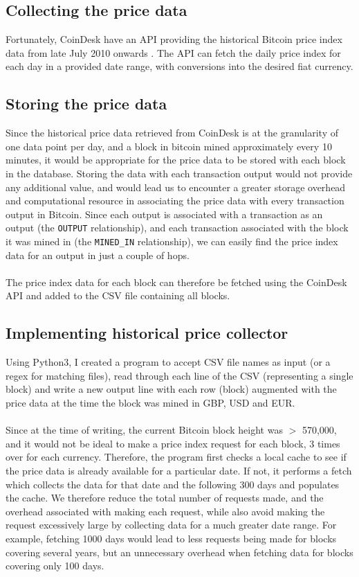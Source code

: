 \subsection{Collecting the price data}
Fortunately, CoinDesk have an API providing the historical Bitcoin price index data from late July 2010 onwards \cite{RefWorks:doc:5cacd8cbe4b092e311880f2b}. The API can fetch the daily price index for each day in a provided date range, with conversions into the desired fiat currency. 

\subsection{Storing the price data}
Since the historical price data retrieved from CoinDesk is at the granularity of one data point per day, and a block in bitcoin mined approximately every 10 minutes, it would be appropriate for the price data to be stored with each block in the database. Storing the data with each transaction output would not provide any additional value, and would lead us to encounter a greater storage overhead and computational resource in associating the price data with every transaction output in Bitcoin. Since each output is associated with a transaction as an output (the \texttt{OUTPUT} relationship), and each transaction associated with the block it was mined in (the \texttt{MINED\_IN} relationship), we can easily find the price index data for an output in just a couple of hops. 
\\\\
The price index data for each block can therefore be fetched using the CoinDesk API and added to the CSV file containing all blocks. 

\subsection{Implementing historical price collector}
Using Python3, I created a program to accept CSV file names as input (or a regex for matching files), read through each line of the CSV (representing a single block) and write a new output line with each row (block) augmented with the price data at the time the block was mined in GBP, USD and EUR. 
\\\\
Since at the time of writing, the current Bitcoin block height was $>$ 570,000, and it would not be ideal to make a price index request for each block, 3 times over for each currency. Therefore, the program first checks a local cache to see if the price data is already available for a particular date. If not, it performs a fetch which collects the data for that date and the following 300 days and populates the cache. We therefore reduce the total number of requests made, and the overhead associated with making each request, while also avoid making the request excessively large by collecting data for a much greater date range. For example, fetching 1000 days would lead to less requests being made for blocks covering several years, but an unnecessary overhead when fetching data for blocks covering only 100 days.

